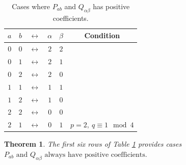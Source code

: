 \documentclass[11pt]{amsart}
\numberwithin{equation}{section}
\theoremstyle{plain}
\newtheorem{theorem}[equation]{Theorem}
\theoremstyle{definition}
\begin{document}
\begin{table}[h]

\begin{center}
\begin{tabular}{|ccccc|c|}\hline
$a$ & $b$ & $\leftrightarrow$ & $\alpha$ & $\beta$& Condition\\
\hline
$0$ & $0$ & $\leftrightarrow$ & $2$ & $2$&\\
$0$ & $1$ & $\leftrightarrow$ & $2$ & $1$&\\
$0$ & $2$ & $\leftrightarrow$ & $2$ & $0$&\\
$1$ & $1$ & $\leftrightarrow$ & $1$ & $1$&\\
$1$ & $2$ & $\leftrightarrow$ & $1$ & $0$&\\
$2$ & $2$ & $\leftrightarrow$ & $0$ & $0$&\\
$2$ & $1$ & $\leftrightarrow$ & $0$ & $1$ & $p=2,\ q\equiv 1\mod 4$\\
\hline
\end{tabular}

\caption{Cases where $P_{ab}$ and $Q_{\alpha\beta}$ has positive coefficients.} \label{tab:positive}
\end{center}
\end{table}




\begin{theorem}\label{thm:positive}
The first six rows of Table \ref{tab:positive} provides cases $P_{ab}\text{ and }Q_{\alpha\beta} \text{ always have positive coefficients. }$

\end{theorem}
\end{document}
